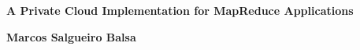 \section*{}

\begin{center}

\vspace*{\fill}

{\huge \bf{A Private Cloud Implementation for MapReduce Applications}}

\vspace{9.8cm}

\textbf{Marcos Salgueiro Balsa}

\end{center}

\vspace*{\fill}